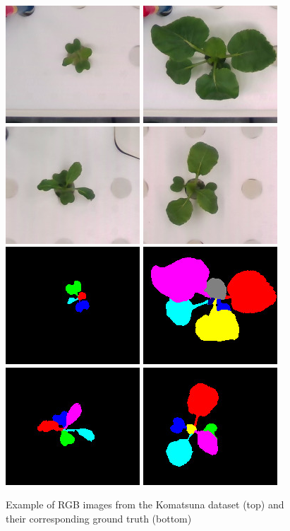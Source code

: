 \documentclass[../thesis.tex]{subfiles}
\begin{document}
    \begin{figure}[H]
        \centering
        \includegraphics[width=0.2\linewidth]{img/leaf/dataset-Komatsuna-rgb-1}
        \includegraphics[width=0.2\linewidth]{img/leaf/dataset-Komatsuna-rgb-2}
        \includegraphics[width=0.2\linewidth]{img/leaf/dataset-Komatsuna-rgb-3}
        \includegraphics[width=0.2\linewidth]{img/leaf/dataset-Komatsuna-rgb-4} \\
        \includegraphics[width=0.2\linewidth]{img/leaf/dataset-Komatsuna-label-1}
        \includegraphics[width=0.2\linewidth]{img/leaf/dataset-Komatsuna-label-2}
        \includegraphics[width=0.2\linewidth]{img/leaf/dataset-Komatsuna-label-3}
        \includegraphics[width=0.2\linewidth]{img/leaf/dataset-Komatsuna-label-4} \\
        \caption{Example of RGB images from the  Komatsuna dataset (top) and their corresponding ground truth (bottom)}
        \label{fig:07-dataset-komatsuna}
    \end{figure}
    
\end{document}
